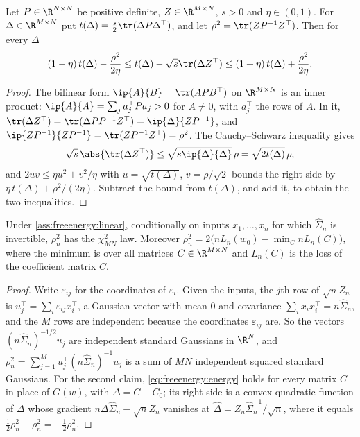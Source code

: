 \begin{refsection}
\begin{lemma}\label{lem:freeenergy:sandwich}
Let $P\in\R^{N\times N}$ be positive definite, $Z\in\R^{M\times N}$, $s>0$ and $\eta\in(0,1)$. For $\Delta\in\R^{M\times N}$ put $t(\Delta)=\frac s2\tr(\Delta P\Delta^\top)$, and let $\rho^2=\tr(ZP^{-1}Z^\top)$. Then for every $\Delta$
\[
(1-\eta)\,t(\Delta)-\frac{\rho^2}{2\eta}\le t(\Delta)-\sqrt s\tr(\Delta Z^\top)\le(1+\eta)\,t(\Delta)+\frac{\rho^2}{2\eta}.
\]
\end{lemma}

\begin{proof}
The bilinear form $\ip{A}{B}=\tr(APB^\top)$ on $\R^{M\times N}$ is an inner product: $\ip{A}{A}=\sum_ja_j^\top Pa_j>0$ for $A\ne0$, with $a_j^\top$ the rows of $A$. In it, $\tr(\Delta Z^\top)=\tr(\Delta PP^{-1}Z^\top)=\ip{\Delta}{ZP^{-1}}$, and $\ip{ZP^{-1}}{ZP^{-1}}=\tr(ZP^{-1}Z^\top)=\rho^2$. The Cauchy--Schwarz inequality gives
\[
\sqrt s\,\abs{\tr(\Delta Z^\top)}\le\sqrt{s\ip{\Delta}{\Delta}}\,\rho=\sqrt{2t(\Delta)}\,\rho ,
\]
and $2uv\le\eta u^2+v^2/\eta$ with $u=\sqrt{t(\Delta)}$, $v=\rho/\sqrt2$ bounds the right side by $\eta\,t(\Delta)+\rho^2/(2\eta)$. Subtract the bound from $t(\Delta)$, and add it, to obtain the two inequalities.
\end{proof}

\begin{lemma}\label{lem:freeenergy:chisq}
Under \cref{ass:freeenergy:linear}, conditionally on inputs $x_1,\dots,x_n$ for which $\hat\Sigma_n$ is invertible, $\rho_n^2$ has the $\chi^2_{MN}$ law. Moreover $\rho_n^2=2\bigl(nL_n(w_0)-\min_{C}nL_n(C)\bigr)$, where the minimum is over all matrices $C\in\R^{M\times N}$ and $L_n(C)$ is the loss of the coefficient matrix $C$.
\end{lemma}

\begin{proof}
Write $\varepsilon_{ij}$ for the coordinates of $\varepsilon_i$. Given the inputs, the $j$th row of $\sqrt nZ_n$ is $u_j^\top=\sum_i\varepsilon_{ij}x_i^\top$, a Gaussian vector with mean $0$ and covariance $\sum_ix_ix_i^\top=n\hat\Sigma_n$, and the $M$ rows are independent because the coordinates $\varepsilon_{ij}$ are. So the vectors $(n\hat\Sigma_n)^{-1/2}u_j$ are independent standard Gaussians in $\R^N$, and $\rho_n^2=\sum_{j=1}^Mu_j^\top(n\hat\Sigma_n)^{-1}u_j$ is a sum of $MN$ independent squared standard Gaussians. For the second claim, \eqref{eq:freeenergy:energy} holds for every matrix $C$ in place of $G(w)$, with $\Delta=C-C_0$; its right side is a convex quadratic function of $\Delta$ whose gradient $n\Delta\hat\Sigma_n-\sqrt nZ_n$ vanishes at $\hat\Delta=Z_n\hat\Sigma_n^{-1}/\sqrt n$, where it equals $\tfrac12\rho_n^2-\rho_n^2=-\tfrac12\rho_n^2$.
\end{proof}


\end{refsection}
